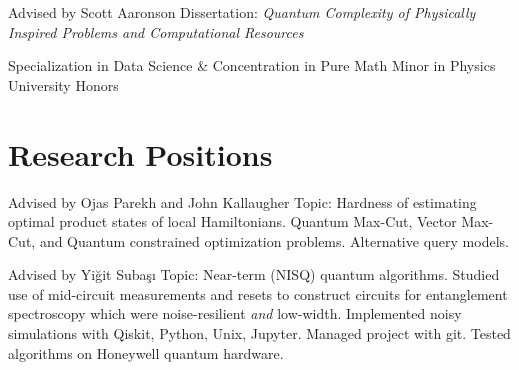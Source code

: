 \documentclass[11pt,letterpaper,serif]{moderncv}
\begin{document}
{
	\normalsize
	\begin{adjustwidth}{.25in}{}
		Advised by Scott Aaronson \newline
		Dissertation: \textit{Quantum Complexity of Physically Inspired Problems and Computational Resources}
	\end{adjustwidth}
}

{}{}

\smallskip

\vspace{-\parsep}
{
	\begin{adjustwidth}{.25in}{}
		Specialization in Data Science \&
		Concentration in Pure Math \newline
		Minor in Physics \newline
		University Honors
	\end{adjustwidth}
}

%
\section{Research Positions}
{
	\begin{adjustwidth}{.25in}{}
		Advised by Ojas Parekh and John Kallaugher \newline
		Topic: Hardness of estimating optimal product states of local Hamiltonians. Quantum Max-Cut, Vector Max-Cut, and Quantum constrained optimization problems.
		Alternative query models.
	\end{adjustwidth}
}

{
	\begin{adjustwidth}{.25in}{}
		Advised by Yi\u{g}it Suba\c{s}\i \newline
		Topic: Near-term (NISQ) quantum algorithms. Studied use of mid-circuit measurements and resets to construct circuits for entanglement spectroscopy which were noise-resilient \textit{and} low-width. \newline
		Implemented noisy simulations with Qiskit, Python, Unix, Jupyter. Managed project with git. Tested algorithms on Honeywell quantum hardware.
	\end{adjustwidth}
}
\end{document}
